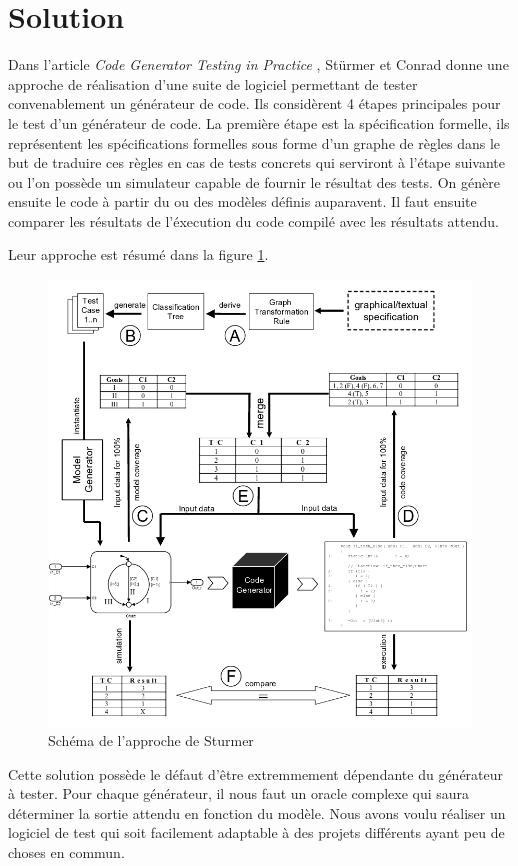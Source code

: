 \chapter*{Solution}


Dans l'article \textit{Code Generator Testing in Practice} \cite{sturmer2004}, Stürmer et Conrad donne une approche de réalisation
d'une suite de logiciel permettant de tester convenablement un générateur de code.
Ils considèrent 4 étapes principales pour le test d'un générateur de code. La première étape est la spécification formelle, ils représentent les spécifications
formelles sous forme d'un graphe de règles dans le but de traduire ces règles en cas de tests concrets qui serviront à l'étape suivante ou l'on possède
un simulateur capable de fournir le résultat des tests. On génère ensuite le code à partir du ou des modèles définis auparavent. Il faut ensuite
comparer les résultats de l'éxecution du code compilé avec les résultats attendu.

Leur approche est résumé dans la figure \ref{codegen}.

\begin{figure}
	\label{codegen}
	\centering
	\includegraphics[width=0.7\linewidth]{images/codegen.png}
	\caption{Schéma de l'approche de Sturmer}
\end{figure}


Cette solution possède le défaut d'être extremmement dépendante du générateur à tester. Pour chaque générateur, il nous faut un oracle complexe
qui saura déterminer la sortie attendu en fonction du modèle. Nous avons voulu réaliser un logiciel de test qui soit facilement adaptable à des
projets différents ayant peu de choses en commun. 

